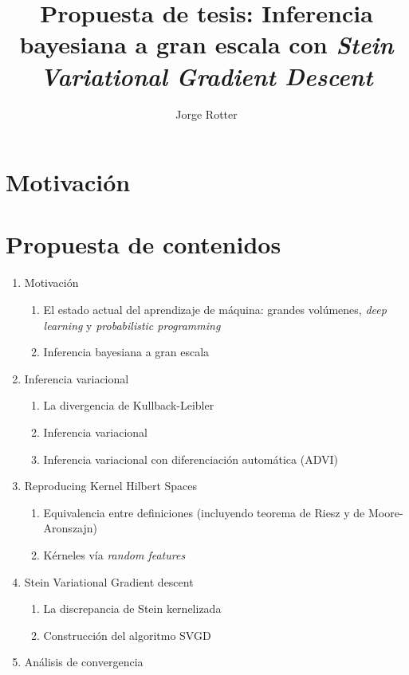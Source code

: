 \documentclass[11pt]{article}
\begin{document}
\title{Propuesta de tesis: Inferencia bayesiana a gran escala con \textit{Stein Variational Gradient Descent}}
\author{Jorge Rotter}
\maketitle

\section{Motivación}

\section{Propuesta de contenidos}
\begin{enumerate}
	\item Motivación
	\begin{enumerate}[label=1.\arabic*]
		\item El estado actual del aprendizaje de máquina:  grandes volúmenes, \textit{deep learning} y \textit{probabilistic programming} 
		\item Inferencia bayesiana a gran escala
	\end{enumerate}
	\item Inferencia variacional
	\begin{enumerate}[label=2.\arabic*]
		\item La divergencia de Kullback-Leibler
		\item Inferencia variacional
		\item Inferencia variacional con diferenciación automática (ADVI)
	\end{enumerate}
	\item Reproducing Kernel Hilbert Spaces
	\begin{enumerate}[label=3.\arabic*]
		\item Equivalencia entre definiciones (incluyendo teorema de Riesz y de Moore-Aronszajn)
		\item Kérneles vía \textit{random features}
	\end{enumerate}
	\item Stein Variational Gradient descent
	\begin{enumerate}[label=4.\arabic*]
		\item La discrepancia de Stein kernelizada
		\item Construcción del algoritmo SVGD
	\end{enumerate}
	\item Análisis de convergencia

\end{enumerate}
\end{document}

